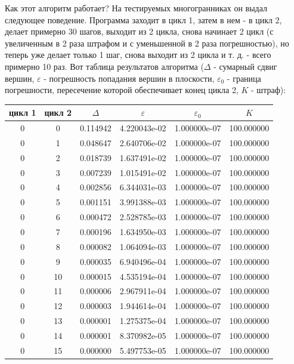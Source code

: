 \documentclass[a4paper,12pt, titlepage]{article}
\begin{document}
\begin{flushleft}
Как этот алгоритм работает? На тестируемых многогранниках он выдал следующее поведение. Программа заходит в цикл 1, затем в нем - 
в цикл 2, делает примерно 30 шагов, выходит из 2 цикла, снова начинает 2 цикл (с увеличенным в 2 раза штрафом и с уменьшенной в 
2 раза погрешностью), но теперь уже делает только 1 шаг, снова выходит из 2 цикла и т. д. - всего примерно 10 раз.
Вот таблица результатов алгоритма ($\Delta$ - сумарный сдвиг вершин, $\varepsilon$ - погрешность попадания вершин в плоскости,
$\varepsilon_{0}$ - граница погрешности, пересечение которой обеспечивает конец цикла 2, $K$ - штраф):\\
\begin{tabular}{|c|c|c|c|c|c|}
\hline
 цикл 1 & цикл 2 & $\Delta$ & $\varepsilon$& $\varepsilon_{0}$&  $K$\\
\hline
 0 & 0 & 0.114942 & 4.220043e-02 & 1.000000e-07 & 100.000000\\
\hline
 0 & 1 & 0.048647 & 2.640706e-02 & 1.000000e-07 & 100.000000\\
\hline
 0 & 2 & 0.018739 & 1.637491e-02 & 1.000000e-07 & 100.000000\\
\hline
 0 & 3 & 0.007239 & 1.015491e-02 & 1.000000e-07 & 100.000000\\
\hline
 0 & 4 & 0.002856 & 6.344031e-03 & 1.000000e-07 & 100.000000\\
\hline
 0 & 5 & 0.001151 & 3.991388e-03 & 1.000000e-07 & 100.000000\\
\hline
 0 & 6 & 0.000472 & 2.528785e-03 & 1.000000e-07 & 100.000000\\
\hline
 0 & 7 & 0.000196 & 1.634950e-03 & 1.000000e-07 & 100.000000\\
\hline
 0 & 8 & 0.000082 & 1.064094e-03 & 1.000000e-07 & 100.000000\\
\hline
 0 & 9 & 0.000035 & 6.940496e-04 & 1.000000e-07 & 100.000000\\
\hline
 0 & 10 & 0.000015 & 4.535194e-04 & 1.000000e-07 & 100.000000\\
\hline
 0 & 11 & 0.000006 & 2.967911e-04 & 1.000000e-07 & 100.000000\\
\hline
 0 & 12 & 0.000003 & 1.944614e-04 & 1.000000e-07 & 100.000000\\
\hline
 0 & 13 & 0.000001 & 1.275375e-04 & 1.000000e-07 & 100.000000\\
\hline
 0 & 14 & 0.000001 & 8.370982e-05 & 1.000000e-07 & 100.000000\\
\hline
 0 & 15 & 0.000000 & 5.497753e-05 & 1.000000e-07 & 100.000000\\

\end{tabular}
\end{flushleft}
\end{document}
